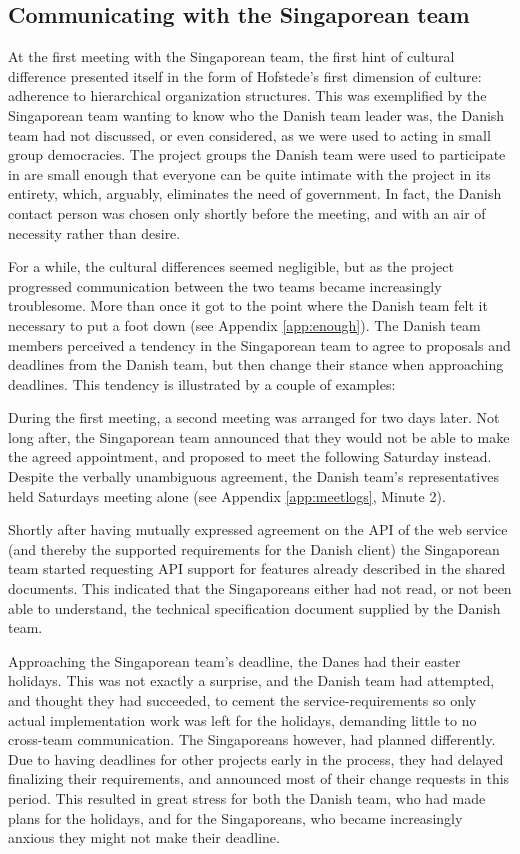 \subsection{Communicating with the Singaporean team}
\label{sec:communicating}

At the first meeting with the Singaporean team, the first hint of cultural
difference presented itself in the form of Hofstede's first dimension of
culture: adherence to hierarchical organization structures\cite{surprises}.
This was exemplified by the Singaporean team wanting to know who the Danish
team leader was, the Danish team had not discussed, or even considered, as we
were used to acting in small group democracies. The project groups the Danish
team were used to participate in are small enough that everyone can be quite
intimate with the project in its entirety, which, arguably, eliminates the need
of government. In fact, the Danish contact person was chosen only shortly
before the meeting, and with an air of necessity rather than desire.

For a while, the cultural differences seemed negligible, but as the project
progressed communication between the two teams became increasingly troublesome.
More than once it got to the point where the Danish team felt it necessary to
put a foot down (see Appendix \ref{app:enough}). The Danish team members perceived a tendency
in the Singaporean team to agree to
proposals and deadlines from the Danish team, but then change their stance when
approaching deadlines. This tendency is illustrated by a couple of examples:

During the first meeting, a second meeting was arranged for two days later. Not
long after, the Singaporean team announced that they would not be able to make
the agreed appointment, and proposed to meet the following Saturday instead.
Despite the verbally unambiguous agreement, the Danish team's
representatives held Saturdays meeting alone (see Appendix \ref{app:meetlogs},
Minute 2).

Shortly after having mutually expressed
agreement on the API of the web service (and thereby the supported requirements
for the Danish client) the Singaporean team started requesting API support for
features already described in the shared documents.
This indicated that the Singaporeans either had not read, or not been able to
understand, the technical specification document supplied by the Danish team.

Approaching the Singaporean team's deadline, the Danes had their easter
holidays. This was not exactly a surprise, and the Danish team had attempted,
and thought they had succeeded, to cement the service-requirements so only
actual implementation work was left for the holidays, demanding little to no
cross-team communication. The Singaporeans however, had planned differently.
Due to having deadlines for other projects early in the process, they had
delayed finalizing their requirements, and announced most of their change
requests in this period. This resulted in great stress for both the Danish
team, who had made plans for the holidays, and for the Singaporeans, who became
increasingly anxious they might not make their deadline.

